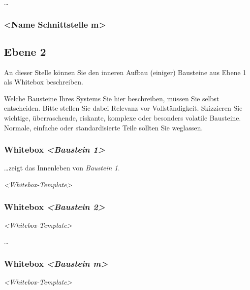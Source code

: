 \documentclass[]{article}
\begin{document}
\ldots{}

\subsubsection{\textless{}Name Schnittstelle
m\textgreater{}}\label{__name_schnittstelle_m}

\subsection{Ebene 2}\label{_ebene_2}

An dieser Stelle können Sie den inneren Aufbau (einiger) Bausteine aus
Ebene 1 als Whitebox beschreiben.

Welche Bausteine Ihres Systems Sie hier beschreiben, müssen Sie selbst
entscheiden. Bitte stellen Sie dabei Relevanz vor Vollständigkeit.
Skizzieren Sie wichtige, überraschende, riskante, komplexe oder
besonders volatile Bausteine. Normale, einfache oder standardisierte
Teile sollten Sie weglassen.

\subsubsection{\texorpdfstring{Whitebox \emph{\textless{}Baustein
1\textgreater{}}}{Whitebox \textless{}Baustein 1\textgreater{}}}\label{_whitebox_emphasis_baustein_1_emphasis}

\ldots{}zeigt das Innenleben von \emph{Baustein 1}.

\emph{\textless{}Whitebox-Template\textgreater{}}

\subsubsection{\texorpdfstring{Whitebox \emph{\textless{}Baustein
2\textgreater{}}}{Whitebox \textless{}Baustein 2\textgreater{}}}\label{_whitebox_emphasis_baustein_2_emphasis}

\emph{\textless{}Whitebox-Template\textgreater{}}

\ldots{}

\subsubsection{\texorpdfstring{Whitebox \emph{\textless{}Baustein
m\textgreater{}}}{Whitebox \textless{}Baustein m\textgreater{}}}\label{_whitebox_emphasis_baustein_m_emphasis}

\emph{\textless{}Whitebox-Template\textgreater{}}
\end{document}
